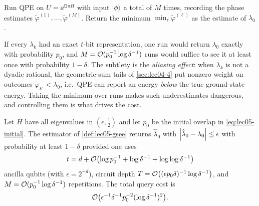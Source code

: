 \begin{definition}
\label{def:lec05-gsee}
Run QPE on $U=\ee^{\ii 2\pi H}$ with input $\ket{\phi}$ a total of $M$ times,
recording the phase estimates $\tilde\varphi^{(1)},\dots,\tilde\varphi^{(M)}$.
Return the minimum $\min_\ell\tilde\varphi^{(\ell)}$ as the estimate of
$\lambda_0$.
\end{definition}

If every $\lambda_k$ had an exact $t$-bit representation, one run would return
$\lambda_0$ exactly with probability $p_0$, and $M=\mathcal{O}(p_0^{-1}\log\delta^{-1})$
runs would suffice to see it at least once with probability $1-\delta$. The
subtlety is the \emph{aliasing effect}: when $\lambda_k$ is not a dyadic rational,
the geometric-sum tails of \cref{sec:lec04-4} put nonzero weight on outcomes
$\tilde\varphi_{k'}<\lambda_0$, i.e.\ QPE can report an energy \emph{below} the
true ground-state energy. Taking the minimum over runs makes such underestimates
dangerous, and controlling them is what drives the cost.

\begin{theorem}
\label{thm:lec05-gsee}
Let $H$ have all eigenvalues in $(\epsilon,\tfrac12)$ and let $p_0$ be the initial
overlap in \eqref{eq:lec05-initial}. The estimator of \cref{def:lec05-gsee}
returns $\hat\lambda_0$ with $\left\lvert \hat\lambda_0-\lambda_0 \right\rvert\le\epsilon$ with
probability at least $1-\delta$ provided one uses
\[
  t=d+\mathcal{O}\bigl(\log p_0^{-1}+\log\delta^{-1}+\log\log\delta^{-1}\bigr)
\]
ancilla qubits (with $\epsilon=2^{-d}$), circuit depth
$T=\mathcal{O}\bigl((\epsilon p_0\delta)^{-1}\log\delta^{-1}\bigr)$, and
$M=\mathcal{O}(p_0^{-1}\log\delta^{-1})$ repetitions. The total query cost is
\[
  \mathcal{O}\bigl(\epsilon^{-1}\delta^{-1}p_0^{-2}(\log\delta^{-1})^{2}\bigr).
\]
\end{theorem}

